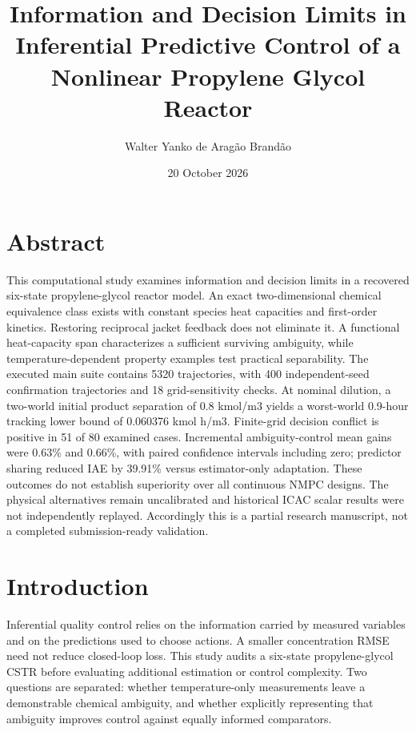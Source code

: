 \documentclass[
  11pt,
]{article}
\title{Information and Decision Limits in Inferential Predictive Control
of a Nonlinear Propylene Glycol Reactor}
\author{Walter Yanko de Aragão Brandão}
\date{20 October 2026}
\begin{document}
\maketitle

\hypertarget{abstract}{%
\section{Abstract}\label{abstract}}

This computational study examines information and decision limits in a
recovered six-state propylene-glycol reactor model. An exact
two-dimensional chemical equivalence class exists with constant species
heat capacities and first-order kinetics. Restoring reciprocal jacket
feedback does not eliminate it. A functional heat-capacity span
characterizes a sufficient surviving ambiguity, while
temperature-dependent property examples test practical separability. The
executed main suite contains 5320 trajectories, with 400
independent-seed confirmation trajectories and 18 grid-sensitivity
checks. At nominal dilution, a two-world initial product separation of
0.8 kmol/m3 yields a worst-world 0.9-hour tracking lower bound of
0.060376 kmol h/m3. Finite-grid decision conflict is positive in 51 of
80 examined cases. Incremental ambiguity-control mean gains were 0.63\%
and 0.66\%, with paired confidence intervals including zero; predictor
sharing reduced IAE by 39.91\% versus estimator-only adaptation. These
outcomes do not establish superiority over all continuous NMPC designs.
The physical alternatives remain uncalibrated and historical ICAC scalar
results were not independently replayed. Accordingly this is a partial
research manuscript, not a completed submission-ready validation.

\hypertarget{introduction}{%
\section{Introduction}\label{introduction}}

Inferential quality control relies on the information carried by
measured variables and on the predictions used to choose actions. A
smaller concentration RMSE need not reduce closed-loop loss. This study
audits a six-state propylene-glycol CSTR before evaluating additional
estimation or control complexity. Two questions are separated: whether
temperature-only measurements leave a demonstrable chemical ambiguity,
and whether explicitly representing that ambiguity improves control
against equally informed comparators.
\end{document}
